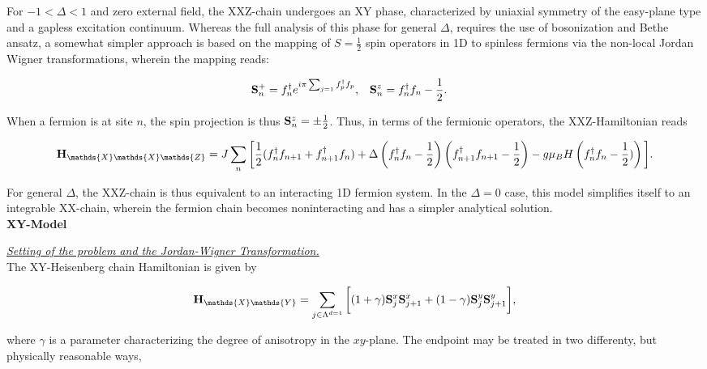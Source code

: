 \documentclass{homework}
\begin{document}
For $-1 < \Delta < 1$ and zero external field, the XXZ-chain undergoes an XY phase, characterized by uniaxial symmetry of the easy-plane type and a gapless excitation continuum. Whereas the full analysis of this phase for general $\Delta$, requires the use of bosonization and Bethe ansatz, a somewhat simpler approach is based on the mapping of $S = \frac{1}{2}$ spin operators in 1D to spinless fermions via the non-local Jordan Wigner transformations, wherein the mapping reads:

\begin{align}
    {\bf S}_{n}^+ &= f_n^\dagger e^{i\pi \sum_{j = 1} f_p^\dagger f_p}, & {\bf S}_n^z &= f_n^\dagger f_n - \frac{1}{2}.
\end{align}

When a fermion is at site $n$, the spin projection is thus ${\bf S}_n^z = \pm \frac{1}{2}$. Thus, in terms of the fermionic operators, the XXZ-Hamiltonian reads 

\begin{equation}
    {\bf H}_{\mathds{X}\mathds{X}\mathds{Z}} = J \sum_{n} \bigg[ \frac{1}{2} (f_n^\dagger f_{n+1} + f_{n+1}^\dagger f_n) + \Delta \left(f_n^\dagger f_n - \frac{1}{2}\right) \left(f_{n+1}^\dagger f_{n+1} - \frac{1}{2}\right) - g\mu_B H \left(f_n^\dagger f_n - \frac{1}{2})\right) \bigg].
    \label{XXZ fermionic hamiltonian}
\end{equation}

For general $\Delta$, the XXZ-chain is thus equivalent to an interacting 1D fermion system. In the $\Delta = 0$ case, this model simplifies itself to an integrable XX-chain, wherein the fermion chain becomes noninteracting and has a simpler analytical solution. \\

\textbf{XY-Model}

\textit{\underline{Setting of the problem and the Jordan-Wigner Transformation.}} \\

The XY-Heisenberg chain Hamiltonian is given by 

\begin{equation}
    {\bf H}_{\mathds{X}\mathds{Y}} = \sum_{j \in \Lambda^{d=1}} \bigg[(1+\gamma) \spin_{j}^x\spin_{j+1}^x + (1-\gamma) \spin_{j}^y\spin_{j+1}^y \bigg],
\end{equation}

where $\gamma$ is a parameter characterizing the degree of anisotropy in the $xy$-plane. The endpoint may be treated in two differenty, but physically reasonable ways, 
\end{document}
